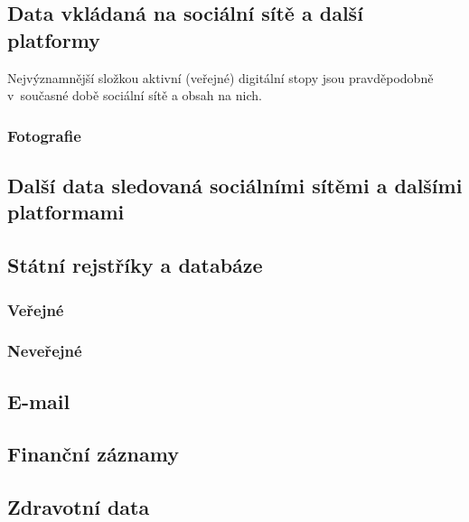 \subsection{Data vkládaná na sociální sítě a další platformy}
Nejvýznamnější složkou aktivní (veřejné) digitální stopy jsou pravděpodobně v~současné době sociální sítě a obsah na nich.


\subsubsection{Fotografie}

\subsection{Další data sledovaná sociálními sítěmi a dalšími platformami}

\subsection{Státní rejstříky a databáze}
\subsubsection{Veřejné}
\subsubsection{Neveřejné}

\subsection{E-mail}

\subsection{Finanční záznamy}

\subsection{Zdravotní data}